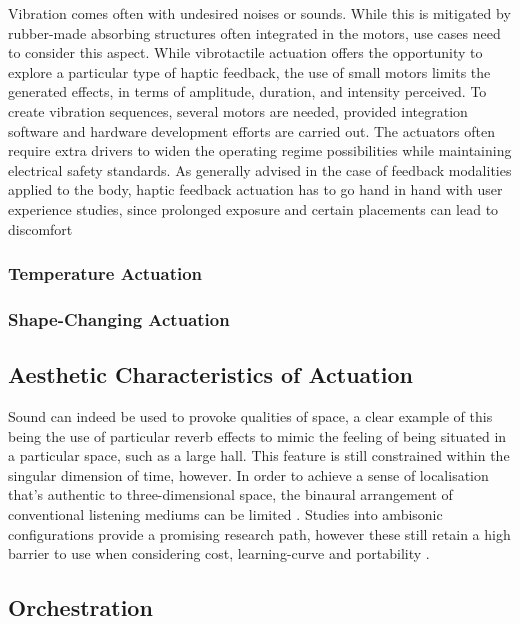 Vibration comes often with undesired noises or sounds. While this is mitigated by rubber-made absorbing structures often integrated in the motors, use cases need to consider this aspect. While vibrotactile actuation offers the opportunity to explore a particular type of haptic feedback, the use of small motors limits the generated effects, in terms of amplitude, duration, and intensity perceived. To create vibration sequences, several motors are needed, provided integration software and hardware development efforts are carried out. The actuators often require extra drivers to widen the operating regime possibilities while maintaining electrical safety standards. As generally advised in the case of feedback modalities applied to the body, haptic feedback actuation has to go hand in hand with user experience studies, since prolonged exposure and certain placements can lead to discomfort

\subsubsection{Temperature Actuation}

\subsubsection{Shape-Changing Actuation}

\subsection{Aesthetic Characteristics of Actuation}

Sound can indeed be used to provoke qualities of space, a clear example of this being the use of particular reverb effects to mimic the feeling of being situated in a particular space, such as a large hall. This feature is still constrained within the singular dimension of time, however. In order to achieve a sense of localisation that's authentic to three-dimensional space, the binaural arrangement of conventional listening mediums can be limited \cite{chang_impairments_2018}. Studies into ambisonic configurations provide a promising research path, however these still retain a high barrier to use when considering cost, learning-curve and portability \cite{huisman_sound_2021}.

\subsection{Orchestration}

